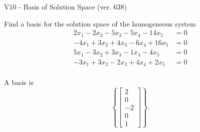 \begin{exercise}
  \begin{exerciseTitle}V10 - Basis of Solution Space (ver. 638)\end{exerciseTitle}
  \begin{exerciseStatement}
    Find a basis for the solution space of the homogeneous system 
\begin{align*}
 2 x_ 1 -2 x_ 2 -5 x_ 3 -5 x_ 4 -14 x_ 5 &= 0  \\ 
  -4 x_ 1 + 3 x_ 2 + 4 x_ 3 -6 x_ 4 + 16 x_ 5 &= 0  \\ 
  5 x_ 1 -3 x_ 2 + 3 x_ 3 -1 x_ 4 -4 x_ 5 &= 0  \\ 
  -3 x_ 1 + 3 x_ 2 -2 x_ 3 + 4 x_ 4 + 2 x_ 5 &= 0  \\ 
 \end{align*}


 
  \end{exerciseStatement}

  \begin{exerciseAnswer}
   A basis is   
\[\left\{\left[\begin{array}{c}
2 \\
0 \\
-2 \\
0 \\
1
\end{array}\right]\right\}.\]

  


  \end{exerciseAnswer}
\end{exercise}